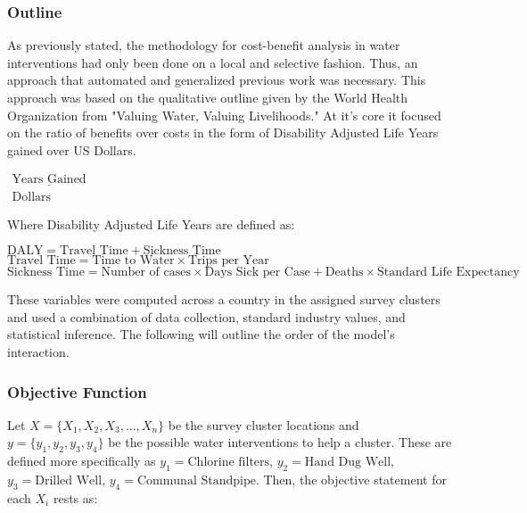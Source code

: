 

\subsubsection*{Outline}
As previously stated, the methodology for cost-benefit analysis in water interventions had only been done on a local and selective fashion.
Thus, an approach that automated and generalized previous work was necessary.
This approach was based on the qualitative outline given by the World Health Organization from "Valuing Water, Valuing Livelihoods."
At it's core it focused on the ratio of benefits over costs in the form of Disability Adjusted Life Years gained over US Dollars.
\\
\begin{center}
$\begin{matrix} \underline{\text{Years Gained}} \\ \text{Dollars} \end{matrix}$
\end{center}

Where Disability Adjusted Life Years are defined as:

\begin{center}
$\text{DALY} = \text{Travel Time} + \text{Sickness Time}$
\\
$\text{Travel Time} = \text{Time to Water} \times \text{Trips per Year}$
\\
$\text{Sickness Time} = \text{Number of cases} \times \text{Days Sick per Case} + \text{Deaths} \times \text{Standard Life Expectancy}$
\end{center}

These variables were computed across a country in the assigned survey clusters and used a combination of data collection, standard industry values, and statistical inference.
The following will outline the order of the model's interaction.

\subsubsection*{Objective Function}
Let $X = \{X_1,X_2,X_3,...,X_n\}$ be the survey cluster locations and $y = \{y_1,y_2,y_3,y_4\}$ be the possible water interventions to help a cluster.
These are defined more specifically as $y_1 = \text{Chlorine filters}$, $y_2 = \text{Hand Dug Well}$, $y_3 = \text{Drilled Well}$, $y_4 = \text{Communal Standpipe}$.
Then, the objective statement for each $X_i$ rests as: %

